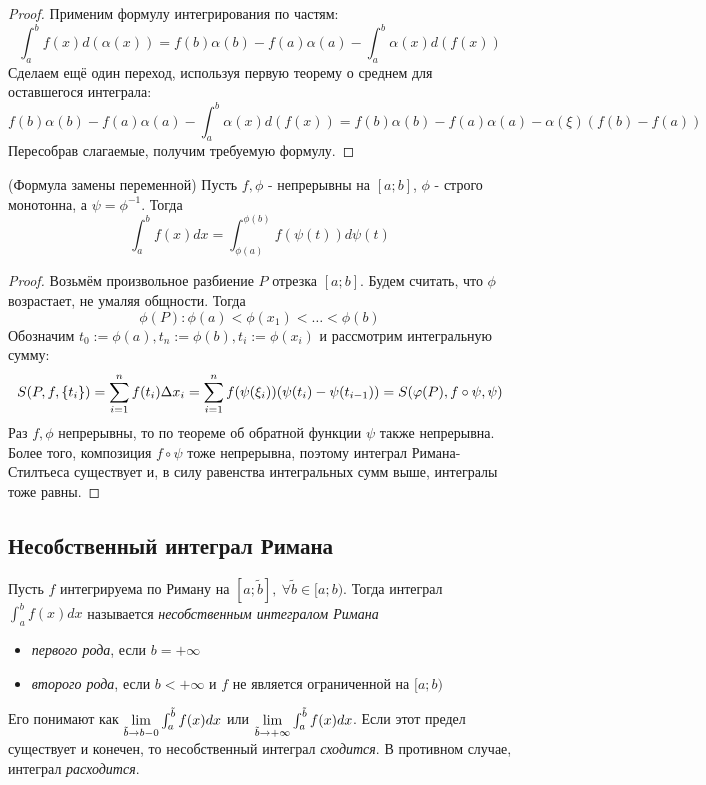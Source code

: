 \begin{proof}
	Применим формулу интегрирования по частям:
	\[
		\int_a^b f(x) d(\alpha(x)) = f(b)\alpha(b) - f(a)\alpha(a) - \int_a^b \alpha(x) d(f(x))
	\]
	Сделаем ещё один переход, используя первую теорему о среднем для оставшегося интеграла:
	\[
		f(b)\alpha(b) - f(a)\alpha(a) - \int_a^b \alpha(x) d(f(x)) = f(b)\alpha(b) - f(a)\alpha(a) - \alpha(\xi)(f(b) - f(a))
	\]
	Пересобрав слагаемые, получим требуемую формулу.
\end{proof}

\begin{theorem} (Формула замены переменной)
	Пусть $f, \phi$ - непрерывны на $[a; b]$, $\phi$ - строго монотонна, а $\psi = \phi^{-1}$. Тогда
	\[
		\int_a^b f(x)dx = \int_{\phi(a)}^{\phi(b)} f(\psi(t)) d\psi(t)
	\]
\end{theorem}

\begin{proof}
	Возьмём произвольное разбиение $P$ отрезка $[a; b]$. Будем считать, что $\phi$ возрастает, не умаляя общности. Тогда
	\[
		\phi(P) \colon \phi(a) < \phi(x_1) < \ldots < \phi(b)
	\]
	Обозначим $t_0 := \phi(a), t_n := \phi(b), t_i := \phi(x_i)$ и рассмотрим интегральную сумму:
	\[
		S(P, f, \{t_i\}) = \sum\limits_{i = 1}^n f(t_i) \Delta x_i = \sum\limits_{i = 1}^n f(\psi(\xi_i))(\psi(t_i) - \psi(t_{i - 1})) = S(\varphi(P), f \circ \psi, \psi)
	\]
	Раз $f, \phi$ непрерывны, то по теореме об обратной функции $\psi$ также непрерывна. Более того, композиция $f \circ \psi$ тоже непрерывна, поэтому интеграл Римана-Стилтьеса существует и, в силу равенства интегральных сумм выше, интегралы тоже равны.
\end{proof}

\subsection{Несобственный интеграл Римана}

\begin{definition}
	Пусть $f$ интегрируема по Риману на $[a; \tilde{b}],\ \forall \tilde{b} \in [a; b)$. Тогда интеграл $\int_a^b f(x)dx$ называется \textit{несобственным интегралом Римана}
	\begin{itemize}
		\item \textit{первого рода}, если $b = +\infty$
		
		\item \textit{второго рода}, если $b < +\infty$ и $f$ не является ограниченной на $[a; b)$
	\end{itemize}
	Его понимают как $\lim\limits_{\tilde{b} \to b-0} \int_a^{\tilde{b}} f(x)dx$ или $\lim\limits_{\tilde{b} \to +\infty} \int_a^{\tilde{b}} f(x)dx$. Если этот предел существует и конечен, то несобственный интеграл \textit{сходится}. В противном случае, интеграл \textit{расходится}.
\end{definition}